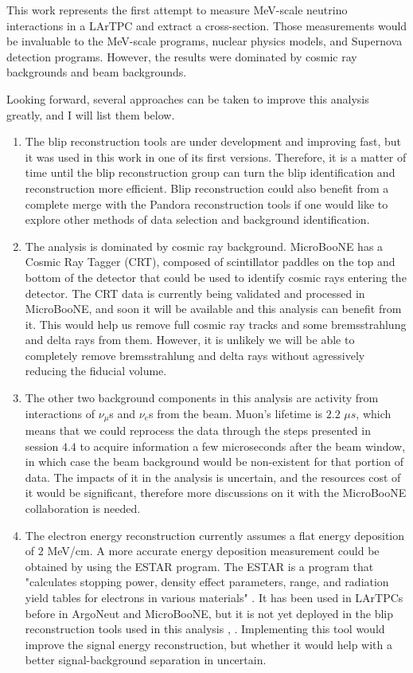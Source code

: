 
This work represents the first attempt to measure MeV-scale neutrino interactions in a LArTPC and extract a cross-section. Those measurements would be invaluable to the MeV-scale programs, nuclear physics models, and Supernova detection programs. 
However, the results were dominated by cosmic ray backgrounds and beam backgrounds. 

Looking  forward, several approaches can be taken to improve this analysis greatly, and I will list them below. 
\begin{enumerate}
 \item The blip reconstruction tools are under development and improving fast, but it was used in this work in one of its first versions. Therefore, it is a matter of time until the blip reconstruction group can turn the blip identification and reconstruction more efficient. Blip reconstruction could also benefit from a complete merge with the Pandora reconstruction tools if one would like to explore other methods of data selection and background identification.

 \item The analysis is dominated by cosmic ray background. MicroBooNE has a Cosmic Ray Tagger (CRT), composed of scintillator paddles on the top and bottom of the detector that could be used to identify cosmic rays entering the detector. The CRT data is currently being validated and processed in MicroBooNE, and soon it will be available and this analysis can benefit from it. This would help us remove full cosmic ray tracks and some bremsstrahlung and delta rays from them. However, it is unlikely we will be able to completely remove bremsstrahlung and delta rays without agressively reducing the fiducial volume.
 
 \item The other two background components in this analysis are activity from interactions of $\nu_{\mu}$s and $\nu_{e}$s from the beam. Muon's lifetime is $2.2$ $\mu s$, which means that we could reprocess the data through the steps presented in session $4.4$ to acquire information a few microseconds after the beam window, in which case the beam background would be non-existent for that portion of data. The impacts of it in the analysis is uncertain, and the resources cost of it would be significant, therefore more discussions on it with the MicroBooNE collaboration is needed. 
 
 \item The electron energy reconstruction currently assumes a flat energy deposition of $2$ MeV/cm. A more accurate energy deposition measurement could be obtained by using the ESTAR program. The ESTAR is a program that "calculates stopping power, density effect parameters, range, and radiation yield tables for electrons in various materials" \cite{ESTAR}. It has been used in LArTPCs before in ArgoNeut and MicroBooNE, but it is not yet deployed in the blip reconstruction tools used in this analysis \cite{argoneut_mev}, \cite{microboone_mev}. Implementing this tool would improve the signal energy reconstruction, but whether it would help with a better signal-background separation in uncertain. 
 

\end{enumerate}

